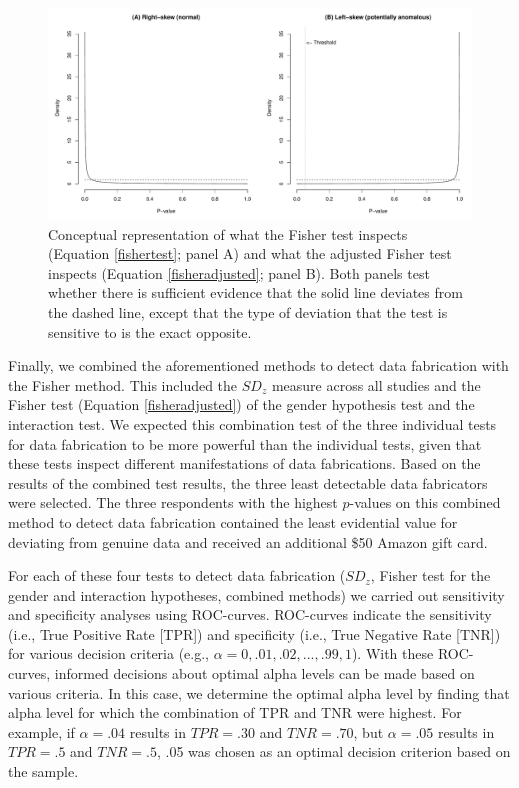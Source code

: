 \documentclass{article}
\begin{document}
\begin{figure}[!ht]
\begin{center}
\includegraphics[width=\textwidth,height=\textheight,keepaspectratio]{../figures/fisherfig.pdf}
\caption{Conceptual representation of what the Fisher test inspects (Equation \ref{fishertest}; panel A) and what the adjusted Fisher test inspects (Equation \ref{fisheradjusted}; panel B). Both panels test whether there is sufficient evidence that the solid line deviates from the dashed line, except that the type of deviation that the test is sensitive to is the exact opposite.}
\label{leftskew}
\end{center}
\end{figure}

Finally, we combined the aforementioned methods to detect data fabrication with the Fisher method. This included the $SD_z$ measure across all studies and the Fisher test (Equation \ref{fisheradjusted}) of the gender hypothesis test and the interaction test.  We expected this combination test of the three individual tests for data fabrication to be more powerful than the individual tests, given that these tests inspect different manifestations of data fabrications. Based on the results of the combined test results, the three least detectable data fabricators were selected. The three respondents with the highest $p$-values on this combined method to detect data fabrication contained the least evidential value for deviating from genuine data and received an additional \$50 Amazon gift card.

For each of these four tests to detect data fabrication ($SD_z$, Fisher test for the gender and interaction hypotheses, combined methods) we carried out sensitivity and specificity analyses using ROC-curves. ROC-curves indicate the sensitivity (i.e., True Positive Rate [TPR]) and specificity (i.e., True Negative Rate [TNR]) for various decision criteria (e.g., $\alpha=0, .01, .02, ..., .99, 1$). With these ROC-curves, informed decisions about optimal alpha levels can be made based on various criteria. In this case, we determine the optimal alpha level by finding that alpha level for which the combination of TPR and TNR were highest. For example, if $\alpha=.04$ results in $TPR=.30$ and $TNR=.70$, but $\alpha=.05$ results in $TPR=.5$ and $TNR=.5$, .05 was chosen as an optimal decision criterion based on the sample. 
\end{document}
